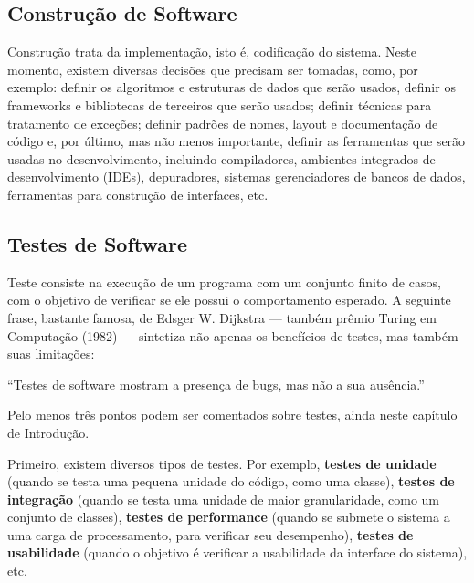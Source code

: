 \documentclass[
  11pt,
  twoside]{book}
\renewenvironment{quote}{\centering \vspace{1.5ex} \begin{tcolorbox}[colback=backcolor, width=4.9in]}{\end{tcolorbox}}
\begin{document}
\hypertarget{construuxe7uxe3o-de-software}{%
\subsection{Construção de Software}\label{construuxe7uxe3o-de-software}}

 Construção trata da implementação, isto
é, codificação do sistema. Neste momento, existem diversas decisões que
precisam ser tomadas, como, por exemplo: definir os algoritmos e
estruturas de dados que serão usados, definir os frameworks e
bibliotecas de terceiros que serão usados; definir técnicas para
tratamento de exceções; definir padrões de nomes, layout e documentação
de código e, por último, mas não menos importante, definir as
ferramentas que serão usadas no desenvolvimento, incluindo compiladores,
ambientes integrados de desenvolvimento (IDEs), depuradores, sistemas
gerenciadores de bancos de dados, ferramentas para construção de
interfaces, etc.

\hypertarget{testes-de-software}{%
\subsection{Testes de Software}\label{testes-de-software}}

  Teste consiste na
execução de um programa com um conjunto finito de casos, com o objetivo
de verificar se ele possui o comportamento esperado. A seguinte frase,
bastante famosa, de Edsger W. Dijkstra --- também prêmio Turing em
Computação (1982) --- sintetiza não apenas os benefícios de testes, mas
também suas limitações:

\begin{quote}
``Testes de software mostram a presença de bugs, mas não a sua
ausência.''
\end{quote}

Pelo menos três pontos podem ser comentados sobre testes, ainda neste
capítulo de Introdução.

Primeiro, existem diversos tipos de testes. Por exemplo, \textbf{testes
de unidade} (quando se testa uma pequena unidade do código, como uma
classe), \textbf{testes de integração} (quando se testa uma unidade de
maior granularidade, como um conjunto de classes), \textbf{testes de
performance} (quando se submete o sistema a uma carga de processamento,
para verificar seu desempenho), \textbf{testes de usabilidade} (quando o
objetivo é verificar a usabilidade da interface do sistema), etc.
\end{document}

